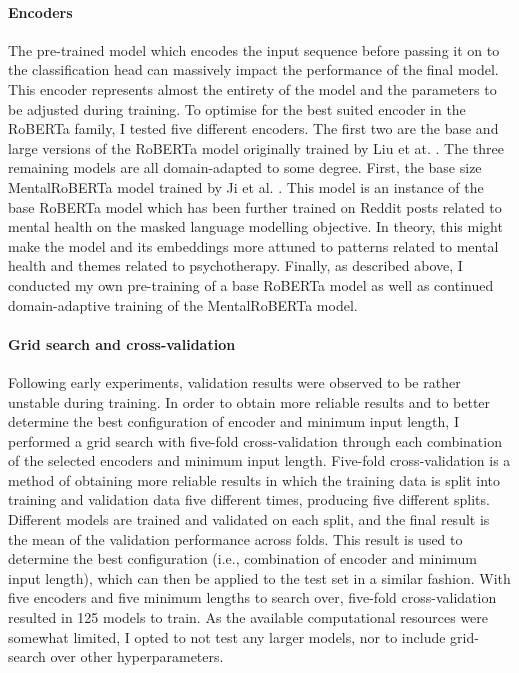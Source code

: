 \documentclass[12pt]{report}
\begin{document}
\paragraph*{Encoders}
The pre-trained model which encodes the input sequence before passing it on to the classification head can massively impact the performance of the final model.
This encoder represents almost the entirety of the model and the parameters to be adjusted during training.
To optimise for the best suited encoder in the RoBERTa family, I tested five different encoders.
The first two are the base and large versions of the RoBERTa model originally trained by Liu et at. \citeyear{roberta}.
The three remaining models are all domain-adapted to some degree.
First, the base size MentalRoBERTa model trained by Ji et al. \citeyear{MentalBERT}.
This model is an instance of the base RoBERTa model which has been further trained on Reddit posts related to mental health on the masked language modelling objective.
In theory, this might make the model and its embeddings more attuned to patterns related to mental health and themes related to psychotherapy.
Finally, as described above, I conducted my own pre-training of a base RoBERTa model as well as continued domain-adaptive training of the MentalRoBERTa model.

\paragraph*{Grid search and cross-validation}
Following early experiments, validation results were observed to be rather unstable during training.
In order to obtain more reliable results and to better determine the best configuration of encoder and minimum input length, I performed a grid search with five-fold cross-validation through each combination of the selected encoders and minimum input length.
Five-fold cross-validation is a method of obtaining more reliable results in which the training data is split into training and validation data five different times, producing five different splits.
Different models are trained and validated on each split, and the final result is the mean of the validation performance across folds.
This result is used to determine the best configuration (i.e., combination of encoder and minimum input length), which can then be applied to the test set in a similar fashion.
With five encoders and five minimum lengths to search over, five-fold cross-validation resulted in 125 models to train.
As the available computational resources were somewhat limited, I opted to not test any larger models, nor to include grid-search over other hyperparameters.
\end{document}
